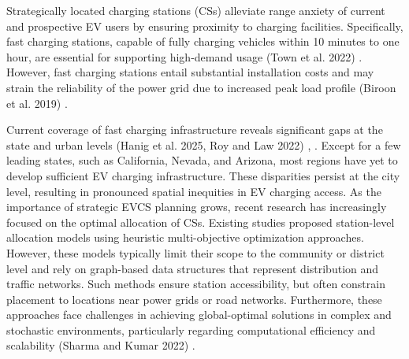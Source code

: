\documentclass[preprint,12pt]{elsarticle}
\begin{document}
\vspace{0.5cm}

Strategically located charging stations (CSs) alleviate range anxiety of current and prospective EV users by ensuring proximity to charging facilities. Specifically, fast charging stations, capable of fully charging vehicles within 10 minutes to one hour, are essential for supporting high-demand usage (Town et al. 2022) \cite{Town2022}. However, fast charging stations entail substantial installation costs and may strain the reliability of the power grid due to increased peak load profile (Biroon et al. 2019) \cite{Biroon2019}. 

\vspace{0.5cm}

Current coverage of fast charging infrastructure reveals significant gaps at the state and urban levels (Hanig et al. 2025, Roy and Law 2022) \cite{Hanig2025}, \cite{Roy2022}. Except for a few leading states, such as California, Nevada, and Arizona, most regions have yet to develop sufficient EV charging infrastructure. These disparities persist at the city level, resulting in pronounced spatial inequities in EV charging access. As the importance of strategic EVCS planning grows, recent research has increasingly focused on the optimal allocation of CSs. Existing studies proposed station-level allocation models using heuristic multi-objective optimization approaches. However, these models typically limit their scope to the community or district level and rely on graph-based data structures that represent distribution and traffic networks. Such methods ensure station accessibility, but often constrain placement to locations near power grids or road networks. Furthermore, these approaches face challenges in achieving global-optimal solutions in complex and stochastic environments, particularly regarding computational efficiency and scalability (Sharma and Kumar 2022) \cite{Sharma2022}.

\vspace{0.5cm}
\end{document}
